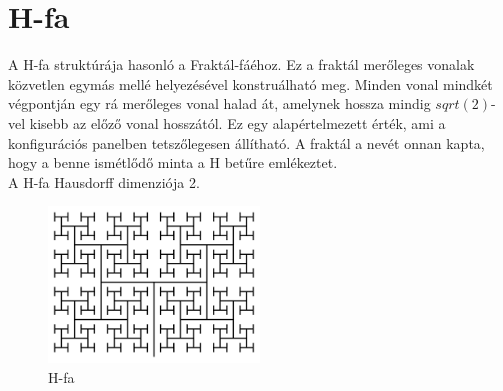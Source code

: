 \section*{H-fa}
A H-fa struktúrája hasonló a Fraktál-fáéhoz. Ez a fraktál merőleges vonalak közvetlen egymás mellé helyezésével konstruálható meg. Minden vonal mindkét végpontján egy rá merőleges vonal halad át, amelynek hossza mindig $sqrt(2)$-vel kisebb az előző vonal hosszától. Ez egy alapértelmezett érték, ami a konfigurációs panelben tetszőlegesen állítható. A fraktál a nevét onnan kapta, hogy a benne ismétlődő minta a H betűre emlékeztet.\\ 
A H-fa Hausdorff dimenziója 2.
\begin{figure}[!ht]
	\begin{center}
		\includegraphics[width=0.5\textwidth]{img/HTree}
		\caption[labelInTOC]{H-fa}
	\end{center}
\end{figure}
